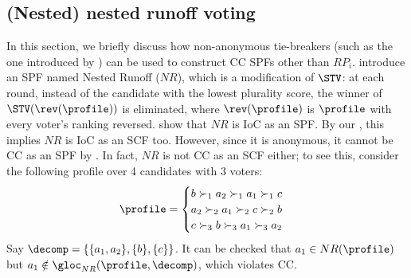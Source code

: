 \subsection{(Nested) nested runoff voting}\label{appsec:nested}

In this section, we briefly discuss how non-anonymous tie-breakers (such as the one introduced by \citet{Zavist89:Complete}) can be used to construct CC SPFs other than $RP_i$. \citet{Freeman14:Axiomatic} introduce an SPF named Nested Runoff ($NR$), which is a modification of $\STV$: at each round, instead of the candidate with the lowest plurality score, the winner of $\STV(\rev(\profile))$ is eliminated, where $\rev(\profile)$ is $\profile$ with every voter's ranking reversed. \citeauthor{Freeman14:Axiomatic} show that $NR$ is IoC as an SPF. By our , this implies $NR$ is IoC as an SCF too. However, since it is anonymous, it cannot be CC as an SPF by . In fact, $NR$ is not CC as an SCF either; to see this, consider the following profile over 4 candidates with 3 voters:
\begin{align}
    \profile= \begin{cases}
        b \succ_1 a_2 \succ_1 a_1 \succ_1 c \\
        a_2 \succ_2 a_1 \succ_2 c \succ_2 b \\
        c \succ_3 b \succ_3 a_1 \succ_3 a_2 \label{eq:nested-counter}
    \end{cases}
\end{align}
Say $\decomp=\{\{a_1,a_2\}, \{b\}, \{c\}\}$. It can be checked that $a_1 \in NR(\profile)$ but $a_1 \notin \gloc_{NR}(\profile, \decomp)$, which violates CC. 

